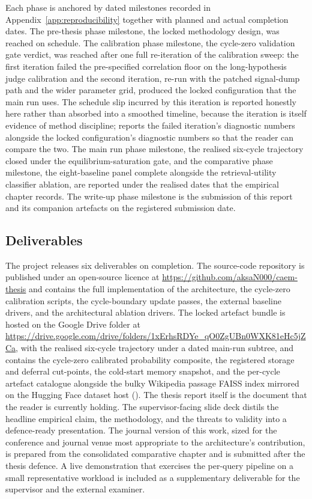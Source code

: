 Each phase is anchored by dated milestones recorded in Appendix~\ref{app:reproducibility} together with planned and actual completion dates. The pre-thesis phase milestone, the locked methodology design, was reached on schedule. The calibration phase milestone, the cycle-zero validation gate verdict, was reached after one full re-iteration of the calibration sweep: the first iteration failed the pre-specified correlation floor on the long-hypothesis judge calibration and the second iteration, re-run with the patched signal-dump path and the wider parameter grid, produced the locked configuration that the main run uses. The schedule slip incurred by this iteration is reported honestly here rather than absorbed into a smoothed timeline, because the iteration is itself evidence of method discipline;  reports the failed iteration's diagnostic numbers alongside the locked configuration's diagnostic numbers so that the reader can compare the two. The main run phase milestone, the realised six-cycle trajectory closed under the equilibrium-saturation gate, and the comparative phase milestone, the eight-baseline panel complete alongside the retrieval-utility classifier ablation, are reported under the realised dates that the empirical chapter records. The write-up phase milestone is the submission of this report and its companion artefacts on the registered submission date.

\subsection{Deliverables}
\label{sec:pm-deliverables}

The project releases six deliverables on completion. The source-code repository is published under an open-source licence at \url{https://github.com/aksaN000/caem-thesis} and contains the full implementation of the architecture, the cycle-zero calibration scripts, the cycle-boundary update passes, the external baseline drivers, and the architectural ablation drivers. The locked artefact bundle is hosted on the Google Drive folder at \url{https://drive.google.com/drive/folders/1xErhsRDYe_qO0ZgUBn0WXK81eHc5jZCa}, with the realised six-cycle trajectory under a dated main-run subtree, and contains the cycle-zero calibrated probability composite, the registered storage and deferral cut-points, the cold-start memory snapshot, and the per-cycle artefact catalogue alongside the bulky Wikipedia passage FAISS index mirrored on the Hugging Face dataset host (). The thesis report itself is the document that the reader is currently holding. The supervisor-facing slide deck distils the headline empirical claim, the methodology, and the threats to validity into a defence-ready presentation. The journal version of this work, sized for the conference and journal venue most appropriate to the architecture's contribution, is prepared from the consolidated comparative chapter and is submitted after the thesis defence. A live demonstration that exercises the per-query pipeline on a small representative workload is included as a supplementary deliverable for the supervisor and the external examiner.

